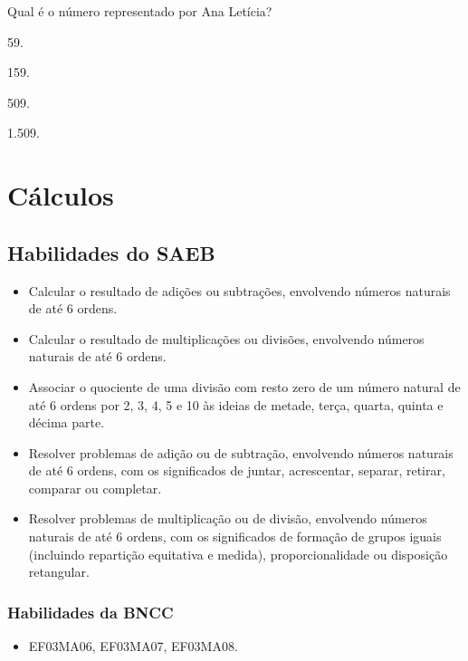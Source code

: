 Qual é o número representado por Ana Letícia? 

\begin{escolha}
  \begin{multicols}{2}
\item
  59.
\item
  159.
\item
  509.
\item
  1.509.
  \end{multicols}
\end{escolha}

\chapter{Cálculos}

\section*{Habilidades do SAEB}

\begin{itemize}
\item Calcular o resultado de adições ou subtrações, envolvendo números
naturais de até 6 ordens.

\item Calcular o resultado de multiplicações ou divisões, envolvendo números
naturais de até 6 ordens.

\item Associar o quociente de uma divisão com resto zero de um número
natural de até 6 ordens por 2, 3, 4, 5 e 10 às ideias de metade, terça,
quarta, quinta e décima parte.

\item Resolver problemas de adição ou de subtração, envolvendo números
naturais de até 6 ordens, com os significados de juntar, acrescentar,
separar, retirar, comparar ou completar.

\item Resolver problemas de multiplicação ou de divisão, envolvendo números
naturais de até 6 ordens, com os significados de formação de grupos
iguais (incluindo repartição equitativa e medida), proporcionalidade ou
disposição retangular.
\end{itemize}

\subsection{Habilidades da BNCC}

\begin{itemize}
\item EF03MA06, EF03MA07, EF03MA08.
\end{itemize}

